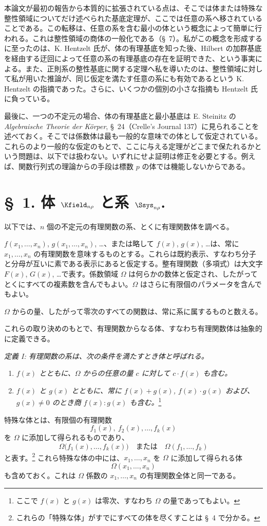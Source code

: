 \documentclass[11pt]{article}
\begin{document}
本論文が最初の報告から本質的に拡張されている点は、そこでは体または特殊な整性領域についてだけ述べられた基底定理が、ここでは任意の系へ移されていることである。この転移は、任意の系を含む最小の体という概念によって簡単に行われる。これは整性領域の商体の一般化である（\S\ 7）。私がこの概念を形成するに至ったのは、K. Hentzelt 氏が、体の有理基底を知った後、Hilbert の加群基底を経由する迂回によって任意の系の有理基底の存在を証明できた、という事実による。また、正則系の整性基底に関する定理へ私を導いたのは、整性領域に対して私が用いた推論が、同じ仮定を満たす任意の系にも有効であるという K. Hentzelt の指摘であった。さらに、いくつかの個別の小さな指摘も Hentzelt 氏に負っている。

最後に、一つの不定元の場合、体の有理基底と最小基底は E. Steinitz の \emph{Algebraische Theorie der Körper}, \S\ 24（Crelle's Journal 137）に見られることを述べておく。そこでは係数体は最も一般的な意味での体として仮定されている。これらのより一般的な仮定のもとで、ここに与える定理がどこまで保たれるかという問題は、以下では扱わない。いずれにせよ証明は修正を必要とする。例えば、関数行列式の理論からの手段は標数 $p$ の体では機能しないからである。

\section*{\S\ 1. 体 $\Kfield_{n\rho}$ と系 $\Ssys_{n\rho}$.}

以下では、$n$ 個の不定元の有理関数の系、とくに有理関数体を調べる。

$f(x_1,\ldots,x_n)$, $g(x_1,\ldots,x_n)$, \ldots、または略して $f(x)$, $g(x)$, \ldots は、常に $x_1,\ldots,x_n$ の有理関数を意味するものとする。これらは既約表示、すなわち分子と分母が互いに素である表示にあると仮定する。整有理関数（多項式）は大文字 $F(x)$, $G(x)$, \ldots で表す。係数領域 $\Omega$ は何らかの数体と仮定され、したがってとくにすべての複素数を含んでもよい。$\Omega$ はさらに有限個のパラメータを含んでもよい。

$\Omega$ からの量、したがって零次のすべての関数は、常に系に属するものと数える。

これらの取り決めのもとで、有理関数からなる体、すなわち有理関数体は抽象的に定義できる。

\emph{定義 I: 有理関数の系は、次の条件を満たすとき体と呼ばれる。}
\begin{enumerate}
\item \emph{$f(x)$ とともに、$\Omega$ からの任意の量 $c$ に対して $c\cdot f(x)$ も含む。}
\item \emph{$f(x)$ と $g(x)$ とともに、常に $f(x)+g(x)$, $f(x)\cdot g(x)$ および、$g(x)\ne0$ のとき商 $f(x):g(x)$ も含む。}\footnote{ここで $f(x)$ と $g(x)$ は零次、すなわち $\Omega$ の量であってもよい。}
\end{enumerate}
特殊な体とは、有限個の有理関数
\[
  f_1(x),\ f_2(x),\ldots, f_k(x)
\]
を $\Omega$ に添加して得られるものであり、
\[
  \Omega\bigl(f_1(x),\ldots,f_k(x)\bigr)
  \quad\text{または}\quad
  \Omega(f_1,\ldots,f_k)
\]
と表す。\footnote{これらの「特殊な体」がすでにすべての体を尽くすことは \S\ 4 で分かる。}
これら特殊な体の中には、$x_1,\ldots,x_n$ を $\Omega$ に添加して得られる体
\[
  \Omega(x_1,\ldots,x_n)
\]
も含めておく。これは $\Omega$ 係数の $x_1,\ldots,x_n$ の有理関数全体と同一である。
\end{document}
